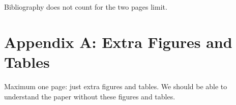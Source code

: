 \documentclass[twocolumn,10pt]{article}
\begin{document}


Bibliography does not count for the two pages limit.


\appendix

\section*{Appendix A: Extra Figures and Tables}

Maximum one page: just extra figures and tables. We should be able to understand the paper without these figures and tables.

 
\end{document}
